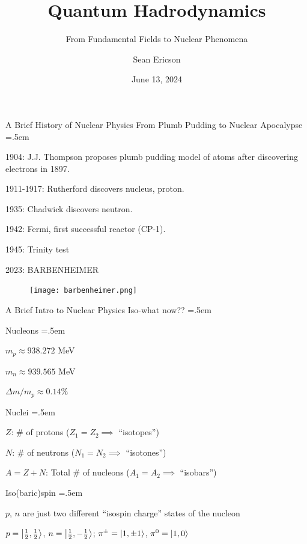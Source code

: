 \documentclass[xcolor={dvipsnames}]{beamer}
\title{Quantum Hadrodynamics}
\subtitle{From Fundamental Fields to Nuclear Phenomena}
\author{Sean Ericson}
\institute{UO\\PHYS 663}
\date{June 13, 2024}
\let\olditemize=\itemize
\let\endolditemize=\enditemize
\renewenvironment{itemize}{\olditemize \itemsep=.5em }{\endolditemize}
\begin{document}
\frame{\titlepage}

\begin{frame}{A Brief History of Nuclear Physics}
\alert{From Plumb Pudding to Nuclear Apocalypse}
\begin{itemize}
    \item<2-> 1904: J.J. Thompson proposes plumb pudding model of atoms after discovering electrons in 1897.
    \item<3-> 1911-1917: Rutherford discovers nucleus, proton.
    \item<4-> 1935: Chadwick discovers neutron.
    \item<5-> 1942: Fermi, first successful reactor (CP-1).
    \item<6-> 1945: Trinity test
    \item<7-> 2023: BARBENHEIMER
\end{itemize}
\end{frame} 

\begin{frame}
    \begin{figure}
        \centering
        \texttt{[image: barbenheimer.png]}
    \end{figure}
\end{frame}

\begin{frame}{A Brief Intro to Nuclear Physics}
\alert{Iso-what now??}
\begin{itemize}
    \item<2-> Nucleons
    \begin{itemize}
        \item<3-> $m_p \approx 938.272$ MeV
        \item<4-> $m_n \approx 939.565$ MeV
        \item<5-> $\Delta m / m_p \approx 0.14\%$
    \end{itemize}
    \item<6-> Nuclei
    \begin{itemize}
        \item<7-> $Z$: \# of protons ($Z_1  = Z_2 \implies$ ``isotopes'')
        \item<8-> $N$: \# of neutrons ($N_1 = N_2 \implies$ ``isotones'')
        \item<9-> $A = Z + N$: Total \# of nucleons ($A_1 = A_2 \implies$ ``isobars'')
    \end{itemize}
    \item<10-> Iso(baric)spin
    \begin{itemize}
        \item<11-> $p$, $n$ are just two different ``isospin charge'' states of the nucleon
        \item<12-> $p = \ket{\frac{1}{2}, \frac{1}{2}}$, $n = \ket{\frac{1}{2}, -\frac{1}{2}}$; $\pi^\pm = \ket{1, \pm 1}$, $\pi^0 = \ket{1, 0}$
    \end{itemize}
\end{itemize}
\end{frame}
\end{document}
